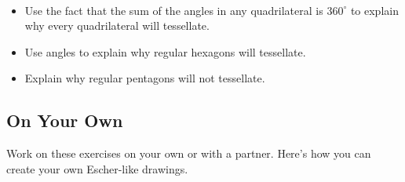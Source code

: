 \bigskip
\bigskip

\begin{thinkpair*}\ 
\begin{itemize}
\item
Use the fact that the sum of the angles in any quadrilateral is $360^\circ$ to explain why every quadrilateral will tessellate.  \\

\item
Use angles to explain why regular hexagons will tessellate.\\

\item
Explain why regular pentagons will not tessellate.\\
\end{itemize}
\end{thinkpair*}

\bigskip
\bigskip

\subsection*{On Your Own}
Work on these exercises on your own or with a partner.
Here's how you can create your own Escher-like drawings.


\bigskip

